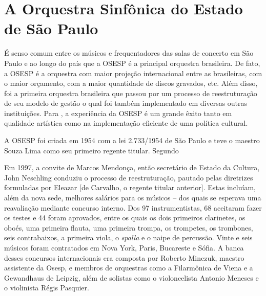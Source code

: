 \documentclass[a4paper, 12pt, openright, oneside, german, french, english, brazil]{abntex2}
\begin{document}
	\section{A Orquestra Sinfônica do Estado de São Paulo}
	
	É senso comum entre os músicos e frequentadores das salas de concerto em São Paulo e ao longo do país que a OSESP é a principal orquestra brasileira. De fato, a OSESP é a orquestra com maior projeção internacional entre as brasileiras, com o maior orçamento, com a maior quantidade de discos gravados, etc. Além disso, foi a primeira orquestra brasileira que passou por um processo de reestruturação de seu modelo de gestão o qual foi também implementado em diversas outras instituições. Para , a experiência da OSESP é um grande êxito tanto em qualidade artística como na implementação eficiente de uma política cultural.
	
	A OSESP foi criada em 1954 com a lei 2.733/1954 de São Paulo e teve o maestro Souza Lima como seu primeiro regente titular. Segundo 
	
	\begin{citacao}
		Em 1997, a convite de Marcos Mendonça, então secretário de Estado da Cultura, John Neschling conduziu o processo de reestruturação, pautado pelas diretrizes formuladas por Eleazar [de Carvalho, o regente titular anterior]. Estas incluíam, além da nova sede, melhores salários para os músicos -- dos quais se esperava uma reavaliação mediante concurso interno. Dos 97 instrumentistas, 68 aceitaram fazer os testes e 44 foram aprovados, entre os quais os dois primeiros clarinetes, os oboés, uma primeira flauta, uma primeira trompa, os trompetes, os trombones, seis contrabaixos, a primeira viola, o \textit{spalla} e o naipe de percussão. Vinte e seis músicos foram contratados em Nova York, Paris, Bucareste e Sófia. A banca desses concursos internacionais era composta por Roberto Minczuk, maestro assistente da Osesp, e membros de orquestras como a Filarmônica de Viena e a Gewandhaus de Leipzig, além de solistas como o violoncelista Antonio Meneses e o violinista Régis Pasquier. \cite{marques2015osesp}
	\end{citacao}
	
\end{document}

